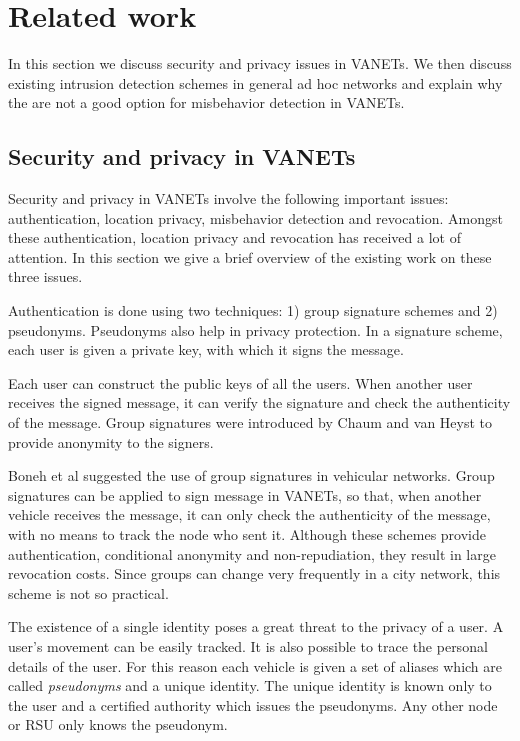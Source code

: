 \documentclass[conference]{IEEEtran}[10pt]
\begin{document}
\section{Related work}
\label{sec:related}
In this section we discuss security and privacy issues in VANETs. 
We then discuss existing intrusion detection schemes in general ad hoc networks and explain why the are not a good option for misbehavior detection 
in VANETs.

\subsection{Security and privacy in VANETs}
\label{subsec:sec_priv}
Security and privacy  in VANETs involve the following important issues: authentication, location privacy, misbehavior detection and 
revocation. Amongst these authentication, location privacy and revocation has received a lot of attention. 
In this section we give a brief overview of the existing work on these three issues.

Authentication is done using two techniques: 
1) group signature schemes and 2) pseudonyms.
Pseudonyms also help in privacy protection. 
In a signature scheme, each user is given a private key, with which it signs the message. 



Each user can construct  the public keys of all the users. 
When another user receives the signed message, it can verify the signature and check the authenticity of the message. 
Group signatures were introduced by Chaum and van Heyst \cite{CH91} 
to provide anonymity to the signers. 



Boneh et al \cite{BBS04} suggested the use of group signatures in vehicular networks. 
Group signatures \cite{SLHP07,CPHL07,SSBP09} can be applied to sign message in VANETs, so that, when  another vehicle receives
the message, it  can only check the authenticity of the message, 
with no means to track the node  who sent it. 
Although these schemes provide authentication, conditional anonymity and non-repudiation, they result in large
revocation costs. 
Since groups can change very frequently in a city network, this scheme is not so practical. 

The existence of a single identity poses a great threat to the privacy of a user.
A user's movement can be easily tracked. It is also possible to trace the  personal details of the user. 
For this reason each vehicle is given a set of aliases which are called \emph{pseudonyms} and a unique identity. 
The unique identity is known only to the user and a certified authority which issues the pseudonyms.
Any other node or RSU only knows the pseudonym. 
\end{document}
